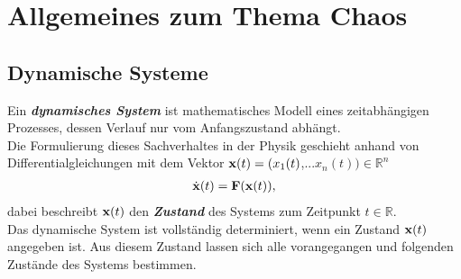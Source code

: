 

\section{Allgemeines zum Thema Chaos}
\label{sec:allgemeines}

\subsection{Dynamische Systeme}
\label{sub:dynamSys}
Ein \textit{\textbf{dynamisches System}} ist mathematisches Modell eines zeitabhängigen Prozesses, dessen Verlauf nur vom Anfangszustand abhängt.\citep[vgl.][]{WikiDynSys}\\
Die Formulierung dieses Sachverhaltes in der Physik geschieht anhand von Differentialgleichungen mit dem Vektor $\boldsymbol{\mathbf{x}}(t)=(x_1(t)$,...$x_n(t))\in\mathbb{R}^n$
\begin{gather}
    \dot{\boldsymbol{\mathbf{x}}}(t)=\boldsymbol{\mathbf{F}}(\boldsymbol{\mathbf{x}}(t)),
    \label{eq:dynamDGL}
\end{gather}
dabei beschreibt $\boldsymbol{\mathbf{x}}(t)$ den \textit{\textbf{Zustand}} des Systems zum Zeitpunkt $t\in\mathbb{R}$.\\
Das dynamische System ist vollständig determiniert, wenn ein Zustand $\boldsymbol{\mathbf{x}}(t)$ angegeben ist. Aus diesem Zustand lassen sich alle vorangegangen und folgenden Zustände des Systems bestimmen.

